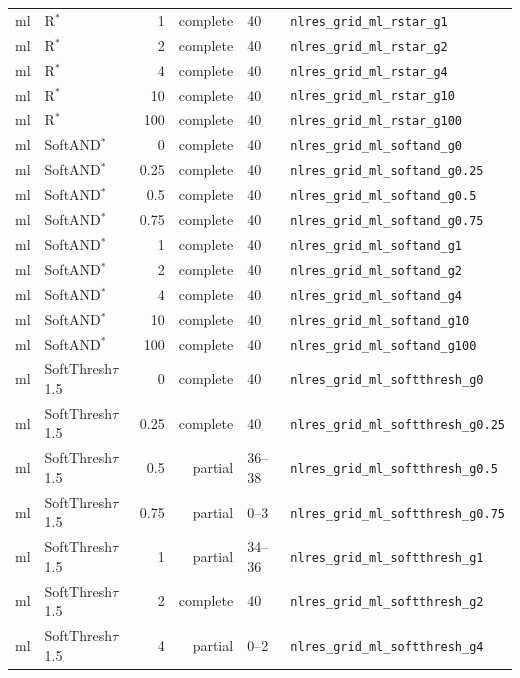 \documentclass[10pt,a4paper]{article}
\begin{document}
{\begin{longtable}{llrrll}
ml & R$^*$ & 1 & complete & 40 & \texttt{nlres\_grid\_ml\_rstar\_g1} \\
ml & R$^*$ & 2 & complete & 40 & \texttt{nlres\_grid\_ml\_rstar\_g2} \\
ml & R$^*$ & 4 & complete & 40 & \texttt{nlres\_grid\_ml\_rstar\_g4} \\
ml & R$^*$ & 10 & complete & 40 & \texttt{nlres\_grid\_ml\_rstar\_g10} \\
ml & R$^*$ & 100 & complete & 40 & \texttt{nlres\_grid\_ml\_rstar\_g100} \\
ml & SoftAND$^*$ & 0 & complete & 40 & \texttt{nlres\_grid\_ml\_softand\_g0} \\
ml & SoftAND$^*$ & 0.25 & complete & 40 & \texttt{nlres\_grid\_ml\_softand\_g0.25} \\
ml & SoftAND$^*$ & 0.5 & complete & 40 & \texttt{nlres\_grid\_ml\_softand\_g0.5} \\
ml & SoftAND$^*$ & 0.75 & complete & 40 & \texttt{nlres\_grid\_ml\_softand\_g0.75} \\
ml & SoftAND$^*$ & 1 & complete & 40 & \texttt{nlres\_grid\_ml\_softand\_g1} \\
ml & SoftAND$^*$ & 2 & complete & 40 & \texttt{nlres\_grid\_ml\_softand\_g2} \\
ml & SoftAND$^*$ & 4 & complete & 40 & \texttt{nlres\_grid\_ml\_softand\_g4} \\
ml & SoftAND$^*$ & 10 & complete & 40 & \texttt{nlres\_grid\_ml\_softand\_g10} \\
ml & SoftAND$^*$ & 100 & complete & 40 & \texttt{nlres\_grid\_ml\_softand\_g100} \\
ml & SoftThresh$\tau$1.5 & 0 & complete & 40 & \texttt{nlres\_grid\_ml\_softthresh\_g0} \\
ml & SoftThresh$\tau$1.5 & 0.25 & complete & 40 & \texttt{nlres\_grid\_ml\_softthresh\_g0.25} \\
ml & SoftThresh$\tau$1.5 & 0.5 & partial & 36--38 & \texttt{nlres\_grid\_ml\_softthresh\_g0.5} \\
ml & SoftThresh$\tau$1.5 & 0.75 & partial & 0--3 & \texttt{nlres\_grid\_ml\_softthresh\_g0.75} \\
ml & SoftThresh$\tau$1.5 & 1 & partial & 34--36 & \texttt{nlres\_grid\_ml\_softthresh\_g1} \\
ml & SoftThresh$\tau$1.5 & 2 & complete & 40 & \texttt{nlres\_grid\_ml\_softthresh\_g2} \\
ml & SoftThresh$\tau$1.5 & 4 & partial & 0--2 & \texttt{nlres\_grid\_ml\_softthresh\_g4} \\

\end{longtable}}
\end{document}
